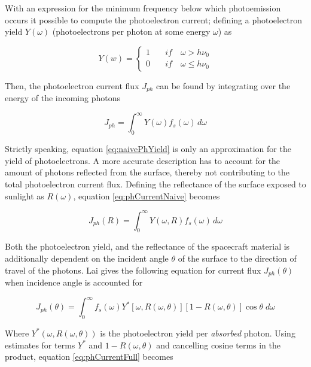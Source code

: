 With an expression for the minimum frequency below which photoemission occurs it possible to compute the photoelectron current; defining a photoelectron yield $Y(\omega)$  (photoelectrons per photon at some energy $\omega$) as

\begin{equation} \label{eq:naivePhYield}
    Y(w) = 
    \begin{cases}
        1 \quad& if \quad \omega > h \nu_0 \\
        0 \quad& if \quad \omega \leqslant h \nu_0
    \end{cases}
\end{equation}


Then, the photoelectron current flux $J_{ph}$ can be found by integrating over the energy of the incoming photons 

\begin{equation}\label{eq:phCurrentNaive}
    J_{ph} = \int^\infty_0 Y(\omega) f_s(\omega) \, d\omega
\end{equation}


Strictly speaking, equation \ref{eq:naivePhYield} is only an approximation for the yield of photoelectrons. A more accurate description has to account for the amount of photons reflected from the surface, thereby not contributing to the total photoelectron current flux. Defining the reflectance of the surface exposed to sunlight as $R(\omega)$, equation \ref{eq:phCurrentNaive} becomes 

\begin{equation}\label{eq:phCurrentR}
    J_{ph}(R) = \int^\infty_0 Y(\omega, R) f_s(\omega) \, d\omega
\end{equation}

Both the photoelectron yield, and the reflectance of the spacecraft material is additionally dependent on the incident angle $\theta$ of the surface to the direction of travel of the photons. Lai gives the following equation \insertref{} for current flux $J_{ph}(\theta)$ when incidence angle is accounted for

\begin{equation}\label{eq:phCurrentFull}
    J_{ph}(\theta) = \int^\infty_0 f_s(\omega) Y^{*}[\omega, R(\omega, \theta)][1 - R(\omega, \theta)] \cos \theta \; d\omega
\end{equation}

Where $Y^{*}(\omega, R(\omega, \theta))$ is the photoelectron yield per \emph{absorbed} photon. Using estimates for terms $Y^{*}$ and $1 - R(\omega, \theta)$ and cancelling cosine terms in the product, equation \ref{eq:phCurrentFull} becomes

